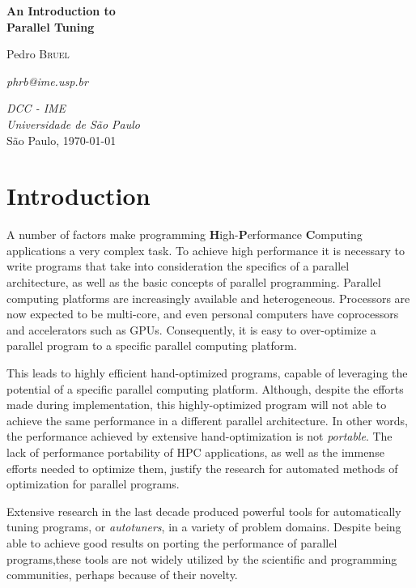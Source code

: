 \documentclass[a4paper, 12pt]{article}
\begin{document}
\hypersetup{backref,pdfpagemode=FullScreen,colorlinks=true}

\thispagestyle{empty}
\begin{center}
    \vspace*{4cm}
    \textbf{\Large{An Introduction to \\Parallel Tuning}}\\

    \vskip 1cm

    Pedro \textsc{Bruel}

    \emph{phrb@ime.usp.br}

    \vfill
    \normalsize{\emph{DCC - IME\\
    Universidade de São Paulo}\\}
    \normalsize{São Paulo, \today}
\end{center}

\newpage

\tableofcontents

\newpage

\section{Introduction} \label{sec:intro}

A number of factors make programming \textbf{H}igh-\textbf{P}erformance
\textbf{C}omputing applications a very complex task. To achieve high
performance it is necessary to write programs that take into consideration
the specifics of a parallel architecture, as well as the basic concepts
of parallel programming. Parallel computing platforms are increasingly
available and heterogeneous. Processors are now expected to be multi-core,
and even personal computers have coprocessors and accelerators such as
GPUs. Consequently, it is easy to over-optimize a parallel program to
a specific parallel computing platform.

This leads to highly efficient hand-optimized programs, capable of leveraging
the potential of a specific parallel computing platform. Although, despite the
efforts made during implementation, this highly-optimized program will not able
to achieve the same performance in a different parallel architecture. In other
words, the performance achieved by extensive hand-optimization is
not \emph{portable}. The lack of performance portability of HPC applications,
as well as the immense efforts needed to optimize them, justify the research
for automated methods of optimization for parallel programs.

Extensive research in the last decade produced powerful tools for
automatically tuning programs, or \emph{autotuners}, in a variety of problem
domains. Despite being able to achieve good results on porting the performance
of parallel programs,these tools are not widely utilized by the scientific
and programming communities, perhaps because of their novelty.
\end{document}
